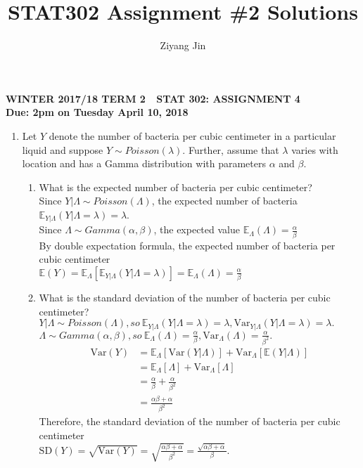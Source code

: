 \documentclass[11pt]{article}
\title{STAT302 Assignment \#2 Solutions}
\author{Ziyang Jin}
\newcommand{\e}{\mathbb{E}}
\newcommand{\var}{\text{Var}}
\newcommand{\sd}{\text{SD}}
\begin{document}
\begin{center}
\textbf{WINTER 2017/18 TERM 2  \,\, STAT 302: ASSIGNMENT 4 \\
Due: 2pm on Tuesday April 10, 2018}
\end{center}


\begin{enumerate}[label=\textbf{Question \arabic*:},start=1]


\item
Let $Y$ denote the number of bacteria per cubic centimeter in a particular liquid and suppose $Y\sim Poisson(\lambda)$. Further, assume that $\lambda$ varies with location and has a Gamma distribution with parameters $\alpha$ and $\beta$.
\begin{enumerate}
	\item What is the expected number of bacteria per cubic centimeter?\\
	
	Since $Y|\Lambda \sim Poisson(\Lambda)$, the expected number of bacteria $\e_{Y|\Lambda}{(Y|\Lambda = \lambda)} = \lambda$.\\
	Since $\Lambda \sim Gamma(\alpha, \beta)$, the expected value $\e_{\Lambda}{(\Lambda)} = \frac{\alpha}{\beta}$ \\
	By double expectation formula, the expected number of bacteria per cubic centimeter \\
	$\e(Y) = \e_{\Lambda}[\e_{Y|\Lambda}(Y|\Lambda = \lambda)] = \e_{\Lambda}(\Lambda) = \frac{\alpha}{\beta}$\\

	\item What is the standard deviation of the number of bacteria per cubic centimeter?\\
	
	$Y|\Lambda \sim Poisson(\Lambda), so \ \e_{Y|\Lambda}(Y|\Lambda = \lambda) = \lambda, \var_{Y|\Lambda}(Y|\Lambda = \lambda) = \lambda.$ \\
	$\Lambda \sim Gamma(\alpha, \beta), so \ \e_{\Lambda}(\Lambda) = \frac{\alpha}{\beta}, \var_{\Lambda}(\Lambda) = \frac{\alpha}{\beta^2}.$
	\begin{align*}
	\var(Y) & = \e_{\Lambda}[\var(Y|\Lambda)] + \var_{\Lambda}[\e(Y|\Lambda)] \\
	& = \e_{\Lambda}[\Lambda] + \var_{\Lambda}[\Lambda] \\
	& = \frac{\alpha}{\beta} + \frac{\alpha}{\beta^2} \\
	& = \frac{\alpha \beta + \alpha}{\beta^2}
	\end{align*}
	Therefore, the standard deviation of the number of bacteria per cubic centimeter\\ $\sd(Y) = \sqrt{\var(Y)} = \sqrt{\frac{\alpha \beta + \alpha}{\beta^2}} = \frac{\sqrt{\alpha \beta + \alpha}}{\beta}$.\\


\end{enumerate}
\end{enumerate}
\end{document}
